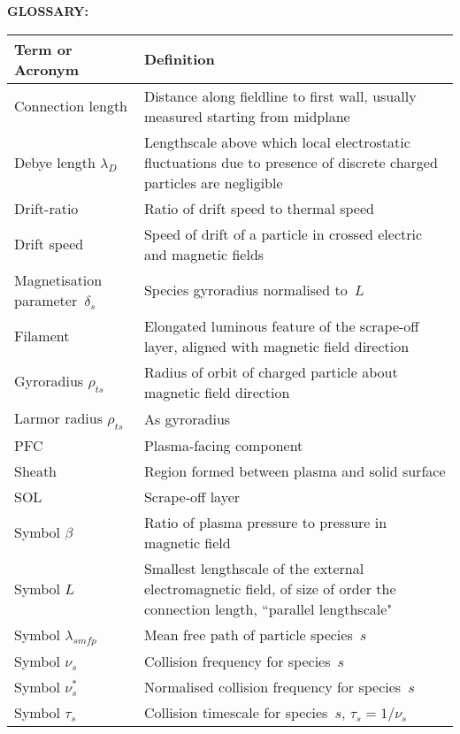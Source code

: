 \begin{table}[h]
\textbf{\textsf{GLOSSARY:}}
\begin{center}
\begin{tabular}{|p{3.6cm}|p{12.0cm}|}
\hline
\textbf{\textsf{Term or Acronym}}
& \textbf{\textsf{Definition}} \\
\hline
Connection length & Distance along fieldline to first wall, usually measured starting from midplane \\
\hline
Debye length \linebreak{}
$\lambda_D$ & Lengthscale above which local electrostatic fluctuations due to presence of discrete charged particles are negligible  \\
\hline
Drift-ratio & Ratio of drift speed to thermal speed \\
\hline
Drift speed & Speed of drift of a particle in crossed electric and magnetic fields \\
\hline
Magnetisation \linebreak{} parameter~$\delta_s$ & Species gyroradius normalised to~$L$ \\
\hline
Filament & Elongated luminous feature of the scrape-off layer, aligned with magnetic field direction \\
\hline
Gyroradius $\rho_{ts}$  & Radius of orbit of charged particle about magnetic field direction  \\
\hline
Larmor radius $\rho_{ts}$  & As gyroradius \\
\hline
PFC & Plasma-facing component \\
\hline
Sheath & Region formed between plasma and solid surface \\
\hline
SOL & Scrape-off layer \\
\hline
Symbol $\beta$ & Ratio of plasma pressure to pressure in magnetic field \\
\hline
Symbol $L$ & Smallest lengthscale of the external electromagnetic field, of size of order the connection length,
``parallel lengthscale" \\
\hline
Symbol $\lambda_{smfp}$ & Mean free path of particle species~$s$ \\
\hline
Symbol $\nu_s$ & Collision frequency for species~$s$ \\
\hline
Symbol $\nu^{*}_s$ & Normalised collision frequency for species~$s$ \\
\hline
Symbol $\tau_s$ & Collision timescale for species~$s$, $\tau_s=1/\nu_s$ \\
\hline
\end{tabular}
\end{center}
\end{table}



